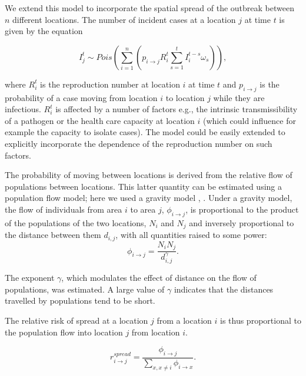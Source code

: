 \documentclass[9pt,twocolumn,twoside,lineno]{pnas-new}
\begin{document}
{We extend this model to incorporate the spatial spread of the outbreak
between \(n\) different locations. The number of incident cases at a
location \(j\) at time \(t\) is given by the equation

\begin{equation}
  I_{j}^{t} \sim 
  Pois\left( 
  \sum_{i = 1}^{n} 
  {\left( p_{i \rightarrow j}
  R_{i}^{t} \sum_{s = 1}^{t}{I_{i}^{t - s} \omega_{s}}
  \right)} 
  \right),
  \label{eq:likelihood}
\end{equation}

where \(R_{i}^{t}\) is the reproduction number at location \(i\) at time
\(t\) and \(p_{i \rightarrow j}\) is the probability of a case moving
from location \(i\) to location \(j\) while they are infectious.
\(R_{i}^{t}\) is affected by a number of factors e.g., the intrinsic
transmissibility of a pathogen or the health care capacity at location
\(i\) (which could influence for example the capacity to isolate cases).
The model could be easily extended to explicitly incorporate the
dependence of the reproduction number on such factors.

The probability of moving between locations is derived from the relative
flow of populations between locations. This latter quantity can be
estimated using a population flow model; here we used a gravity model
\cite{grosche2007175}, \cite{zipf1946p}. Under a gravity model, the flow
of individuals from area \(i\) to area \(j\),
\(\phi_{i \rightarrow j}\), is proportional to the product of the
populations of the two locations, \(N_i\) and \(N_j\) and inversely
proportional to the distance between them \(d_{i, j}\), with all
quantities raised to some power: 
\begin{equation*}
  \phi_{i \rightarrow j} =  \frac{N_iN_j}{d_{i, j}^{\gamma}}.
\end{equation*}

The exponent \(\gamma\),
which modulates the effect of distance on the flow of populations, was
estimated. A large value of \(\gamma\) indicates that the distances
travelled by populations tend to be short.

The relative risk of spread at a location \(j\) from a location \(i\) is
thus proportional to the population flow into location \(j\) from
location \(i\).

\begin{equation*}
  r_{i \rightarrow j}^{spread} = \frac{\phi_{i \rightarrow
  j}}{\sum\limits_{x, x \neq i}{\phi_{i \rightarrow
  x}}}.
\end{equation*}

}
\end{document}
